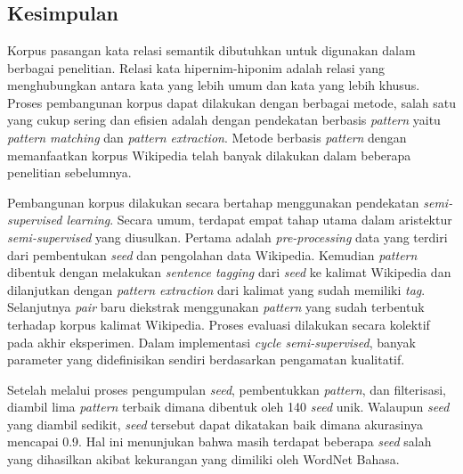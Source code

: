 \chapter{\babEnam}

\section{Kesimpulan}
Korpus pasangan kata relasi semantik dibutuhkan untuk digunakan dalam berbagai penelitian. Relasi kata hipernim-hiponim adalah relasi yang menghubungkan antara kata yang lebih umum dan kata yang lebih khusus. Proses pembangunan korpus dapat dilakukan dengan berbagai metode, salah satu yang cukup sering dan efisien adalah dengan pendekatan berbasis \textit{pattern} yaitu \textit{pattern matching} dan \textit{pattern extraction}. Metode berbasis \textit{pattern} dengan memanfaatkan korpus Wikipedia telah banyak dilakukan dalam beberapa penelitian sebelumnya. 

Pembangunan korpus dilakukan secara bertahap menggunakan pendekatan \textit{semi-supervised learning}. Secara umum, terdapat empat tahap utama dalam aristektur \textit{semi-supervised} yang diusulkan. Pertama adalah \textit{pre-processing} data yang terdiri dari pembentukan \textit{seed} dan pengolahan data Wikipedia. Kemudian \textit{pattern} dibentuk dengan melakukan \textit{sentence tagging} dari \textit{seed} ke kalimat Wikipedia dan dilanjutkan dengan \textit{pattern extraction} dari kalimat yang sudah memiliki \textit{tag}. Selanjutnya \textit{pair} baru diekstrak menggunakan \textit{pattern} yang sudah terbentuk terhadap korpus kalimat Wikipedia. Proses evaluasi dilakukan secara kolektif pada akhir eksperimen. Dalam implementasi \textit{cycle semi-supervised}, banyak parameter yang didefinisikan sendiri berdasarkan pengamatan kualitatif.

Setelah melalui proses pengumpulan \textit{seed}, pembentukkan \textit{pattern}, dan filterisasi, diambil lima \textit{pattern} terbaik dimana dibentuk oleh 140 \textit{seed} unik. Walaupun \textit{seed} yang diambil  sedikit, \textit{seed} tersebut dapat dikatakan baik dimana akurasinya mencapai 0.9. Hal ini menunjukan bahwa masih terdapat beberapa \textit{seed} salah yang dihasilkan akibat kekurangan yang dimiliki oleh WordNet Bahasa.

